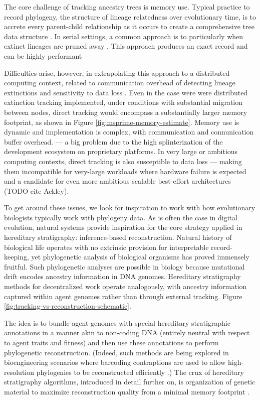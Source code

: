 The core challenge of tracking ancestry trees is memory use.
Typical practice to record phylogeny, the structure of lineage relatedness over evolutionary time, is to accrete every parent-child relationship as it occurs to create a comprehensive tree data structure \citep{moreno2024algorithms}.
In serial settings, a common approach is to  particularly when extinct lineages are pruned away \citep{dolson2024phylotrackpy}.
This approach produces an exact record and can be highly performant ---

Difficulties arise, however, in extrapolating this approach to a distributed computing context, related to communication overhead of detecting lineage extinctions and sensitivity to data loss \citep{moreno2024algorithms}.
Even in the case were were distributed extinction tracking implemented, under conditions with substantial migration between nodes, direct tracking would encompass a substantially larger memory footprint, as shown in Figure \ref{fig:msprime-memory-estimate}.
Memory use is dynamic and implementation is complex, with communication and connunication buffer overhead.
 --- a big problem due to the high splinterization of the development ecosystem on proprietary platforms.
In very large or ambitious computing contexts, direct tracking is also susceptible to data loss --- making them incompatible for very-large workloads where hardware failure is expected and a candidate for even more ambitious scalable best-effort architectures (TODO cite Ackley).

To get around these issues, we look for inspiration to work with how evolutionary biologists typically work with phylogeny data.
As is often the case in digital evolution, natural systems provide inspiration for the core strategy applied in hereditary stratigraphy: inference-based reconstruction.
Natural history of biological life operates with no extrinsic provision for interpretable record-keeping, yet phylogenetic analysis of biological organisms has proved immensely fruitful.
Such phylogenetic analyses are possible in biology because mutational drift encodes ancestry information in DNA genomes.
Hereditary stratigraphy methods for decentralized work operate analogously, with ancestry information captured within agent genomes rather than through external tracking.
Figure \ref{fig:tracking-vs-reconstruction-schematic}.

The idea is to bundle agent genomes with special hereditary stratigraphic annotations in a manner akin to non-coding DNA (entirely neutral with respect to agent traits and fitness) and then use these annotations to perform phylogenetic reconstruction.
(Indeed, such methods are being explored in bioengineering scenarios where barcoding contraptions are used to allow high-resolution phylogenies to be reconstructed efficiently \citep{TODO}.)
The crux of hereditary stratigraphy algorithms, introduced in detail further on, is organization of genetic material to maximize reconstruction quality from a minimal memory footprint \citep{moreno2022hereditary}.

